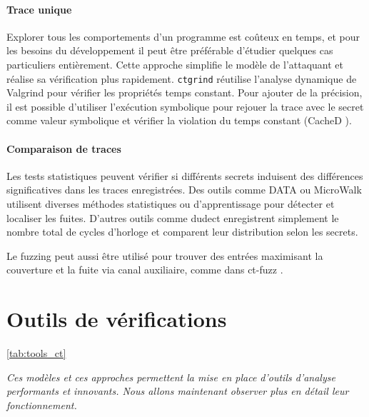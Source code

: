 \paragraph{Trace unique} Explorer tous les comportements d'un programme est coûteux en temps, et pour les besoins du développement il peut être préférable d'étudier quelques cas particuliers entièrement. Cette approche simplifie le modèle de l'attaquant et réalise sa vérification plus rapidement. \texttt{ctgrind} \cite{ctgrind} réutilise l'analyse dynamique de Valgrind pour vérifier les propriétés temps constant. Pour ajouter de la précision, il est possible d'utiliser l'exécution symbolique pour rejouer la trace avec le secret comme valeur symbolique et vérifier la violation du temps constant (CacheD \cite{CacheD}).

\paragraph{Comparaison de traces} Les tests statistiques peuvent vérifier si différents secrets induisent des différences significatives dans les traces enregistrées. Des outils comme DATA \cite{DATA1} ou MicroWalk \cite{MicroWalk} utilisent diverses méthodes statistiques ou d'apprentissage pour détecter et localiser les fuites. D'autres outils comme dudect \cite{dudect} enregistrent simplement le nombre total de cycles d'horloge et comparent leur distribution selon les secrets.

Le fuzzing peut aussi être utilisé pour trouver des entrées maximisant la couverture et la fuite via canal auxiliaire, comme dans ct-fuzz \cite{ctfuzz}.\medbreak


\section{Outils de vérifications}

\ref{tab:tools_ct}

\textit{Ces modèles et ces approches permettent la mise en place d'outils d'analyse performants et innovants. Nous allons maintenant observer plus en détail leur fonctionnement.}

